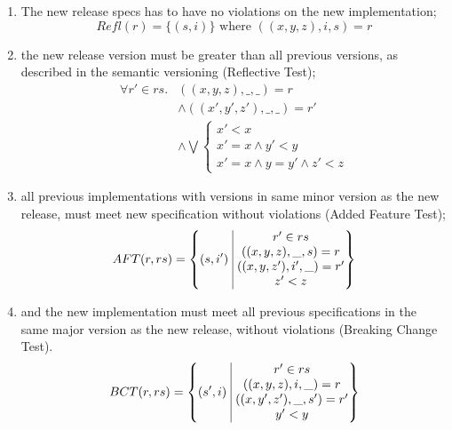 \begin{enumerate}
    \item The new release specs has to have no violations on the new
    implementation;
    $$ Refl(r) = \{(s, i)\} \text{ where } ((x,y,z), i, s) = r $$
    
    \item the new release version must be greater than all previous versions, as
    described in the semantic versioning (Reflective Test);
    \begin{align*}
        \forall r' \in rs. & ((x,y,z), \_,\_) = r \\ 
                           & \land ((x',y',z'), \_, \_) = r' \\ 
                           & \land \bigvee
        \begin{cases}
            x' < x \\
            x' = x \land y' < y \\
            x' = x \land y = y' \land z' < z
        \end{cases}
    \end{align*}
    
    \item all previous implementations with versions in same minor version as the
    new release, must meet new specification without violations (Added Feature
    Test);
    $$AFT(r, rs) = \left\{ (s, i')\ \vline\ 
        \begin{matrix}
            r' \in rs \\
        ((x,y,z), \_, s) = r \\ 
        ((x,y,z'), i', \_) = r'\\
        z' < z \\
        \end{matrix}
    \right\}$$

    \item and the new implementation must meet all previous specifications in the same major version as the new
        release, without violations (Breaking Change Test).
    $$BCT(r, rs) = \left\{ (s', i)\ \vline\ 
        \begin{matrix}
            r' \in rs \\
        ((x, y, z), i, \_) = r \\ 
        ((x, y', z'), \_, s') = r'\\
        y' < y \\
        \end{matrix}
    \right\}$$
\end{enumerate}

